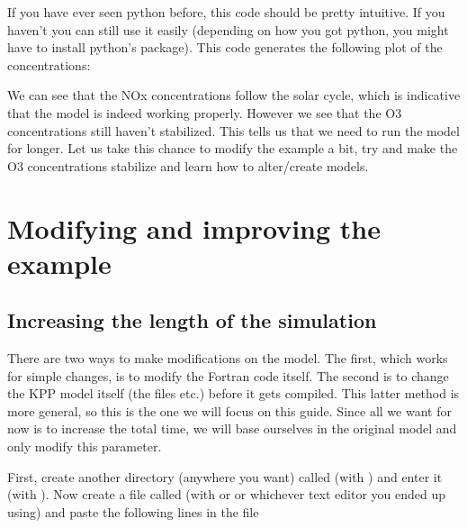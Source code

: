 \documentclass[letterpaper,10pt,openany,oneside]{sphinxmanual}
\begin{document}
If you have ever seen python before, this code should be pretty intuitive. If
you haven't you can still use it easily (depending on how you got python, you
might have to install python's  package).  This code generates the
following plot of the concentrations:
\label{running:test1-time}\begin{figure}[htbp]
\centering

\noindent{}
\label{running:test1-time}\end{figure}

We can see that the NOx concentrations follow the solar cycle, which is
indicative that the model is indeed working properly. However we see that the
O3 concentrations still haven't stabilized. This tells us that we need to run
the model for longer. Let us take this chance to modify the 
example a bit, try and make the O3 concentrations stabilize and learn how to
alter/create models.


\chapter{Modifying and improving the example}
\label{improving:modifying-and-improving-the-example}\label{improving::doc}

\section{Increasing the length of the simulation}
\label{improving:increasing-the-length-of-the-simulation}
There are two ways to make modifications on the model. The first, which works
for simple changes, is to modify the Fortran code itself. The second is to
change the KPP model itself (the  files etc.) before it gets compiled.
This latter method is more general, so this is the one we will focus on this
guide.  Since all we want for now is to increase the total time, we will base
ourselves in the original  model and only modify this
parameter.

First, create another directory (anywhere you want) called  (with
) and enter it (with ). Now create a file called
 (with  or 
or whichever text editor you ended up using) and paste the following lines in
the file
\end{document}
